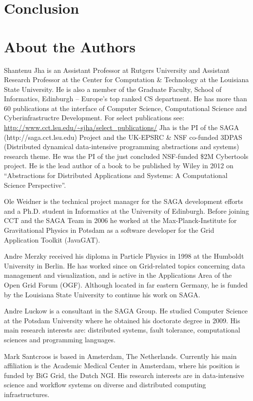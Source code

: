 \documentclass[]{paper}
\begin{document}
\section{Conclusion}


\section*{About the Authors}

Shantenu Jha is an Assistant Professor at Rutgers University and Assistant
Research Professor at the Center for Computation \& Technology at the
Louisiana State University. He is also a member of the Graduate Faculty,
School of Informatics, Edinburgh -- Europe's top ranked CS department. He has
more than 60 publications at the interface of Computer Science, Computational
Science and Cyberinfrastructre Development. For select publications see:
\url{http://www.cct.lsu.edu/~sjha/select_publications/} Jha is the PI of the
SAGA (http://saga.cct.lsu.edu) Project and the UK-EPSRC \& NSF co-funded 3DPAS
(Distributed dynamical data-intensive programming abstractions and systems)
research theme. He was the PI of the just concluded NSF-funded \$2M Cybertools
project. He is the lead author of a book to be published by Wiley in 2012 on
``Abstractions for Distributed Applications and Systems: A Computational
Science Perspective''.

Ole Weidner is the technical project manager for the SAGA development efforts
and a Ph.D. student in Informatics at the University of Edinburgh. Before
joining CCT and the SAGA Team in 2006 he worked at the Max-Planck-Institute
for Gravitational Physics in Potsdam as a software developer for the Grid
Application Toolkit (JavaGAT).

Andre Merzky received his diploma in Particle Physics in 1998 at the Humboldt
University in Berlin. He has worked since on Grid-related topics concerning
data management and visualization, and is active in the Applications Area of
the Open Grid Forum (OGF). Although located in far eastern Germany, he is
funded by the Louisiana State University to continue his work on SAGA.

Andre Luckow is a consultant in the SAGA Group. He studied Computer Science at
the Potsdam University where he obtained his doctorate degree in 2009. His
main research interests are: distributed systems, fault tolerance,
computational sciences and programming languages.

Mark Santcroos is based in Amsterdam, The Netherlands. Currently his main
affiliation is the Academic Medical Center in Amsterdam, where his position is
funded by BiG Grid, the Dutch NGI. His research interests are in
data-intensive science and workflow systems on diverse and distributed
computing infrastructures.



\end{document}
